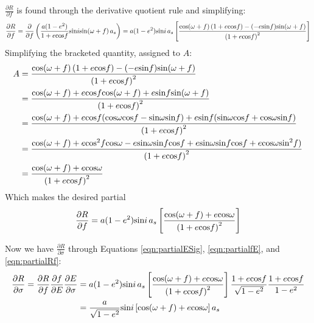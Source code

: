 \documentclass[]{aiaa-tc}%
\begin{document}
 $\frac{\partial R}{\partial f}$ is found through the derivative quotient rule and simplifying:
	\begin{equation}
		\frac{\partial R}{\partial f}=\frac{\partial }{\partial f}\left ( \frac{a(1-e^2)}{1+e\textup{cos}f}\textup{sin}i \textup{sin}(\omega +f ) \, a_s\right )= a(1-e^2)\textup{sin}i\, a_s\left [ \frac{\textup{cos}(\omega +f )\left (1+e\textup{cos}f  \right )-(-e\textup{sin}f)\textup{sin}(\omega +f )}{\left (1+e\textup{cos}f  \right )^2} \right ]
	\end{equation}
Simplifying the bracketed quantity, assigned to $A$:
	\begin{equation}
		\begin{aligned}
 A &= \frac{\textup{cos}(\omega +f )\left (1+e\textup{cos}f  \right )-(-e\textup{sin}f)\textup{sin}(\omega +f )}{\left (1+e\textup{cos}f  \right )^2} \\
&= \frac{\textup{cos}(\omega +f )+e\textup{cos}f\textup{cos}(\omega +f ) +e\textup{sin}f\textup{sin}(\omega +f )}{\left (1+e\textup{cos}f  \right )^2}\\ 
 &= \frac{\textup{cos}(\omega +f )+e\textup{cos}f(\textup{cos}\omega\textup{cos}f - \textup{sin}\omega\textup{sin}f) +e\textup{sin}f(\textup{sin}\omega\textup{cos}f+\textup{cos}\omega\textup{sin}f)}{\left (1+e\textup{cos}f  \right )^2}\\ 
 &= \frac{\textup{cos}(\omega +f )+e\textup{cos}^2f\textup{cos}\omega - e\textup{sin}\omega\textup{sin}f\textup{cos}f +e\textup{sin}\omega\textup{sin}f\textup{cos}f+e\textup{cos}\omega\textup{sin}^2f)}{\left (1+e\textup{cos}f  \right )^2} \\
 &= \frac{\textup{cos}(\omega +f )+e\textup{cos}\omega}{\left (1+e\textup{cos}f  \right )^2} \\
\end{aligned}
	\end{equation}
Which makes the desired partial
	\begin{equation}
\frac{\partial R}{\partial f}= a(1-e^2)\textup{sin}i\, a_s\left [\frac{\textup{cos}(\omega +f )+e\textup{cos}\omega}{\left (1+e\textup{cos}f  \right )^2}  \right ] 
	\label{eqn:partialRf}
	\end{equation}

Now we have $\frac{\partial R}{\partial \sigma}$ through Equations \ref{eqn:partialESig}, \ref{eqn:partialfE}, and \ref{eqn:partialRf}:
	\begin{equation}
\begin{aligned}
\frac{\partial R}{\partial \sigma}= \frac{\partial R}{\partial f}\frac{\partial f}{\partial E}\frac{\partial E}{\partial \sigma}&=a(1-e^2)\textup{sin}i\, a_s\left [\frac{\textup{cos}(\omega +f )+e\textup{cos}\omega}{\left (1+e\textup{cos}f  \right )^2}  \right ] \frac{ 1+e\textup{cos}f }{\sqrt{1-e^2}}\frac{1+e\textup{cos}f}{1-e^2} \\
&=\frac{a}{\sqrt{1-e^2}}\textup{sin}i \left [ \textup{cos}(\omega +f )+e\textup{cos}\omega \right ]a_s
 \end{aligned}
	\label{eqn:partialRSig}
	\end{equation}
\end{document}
